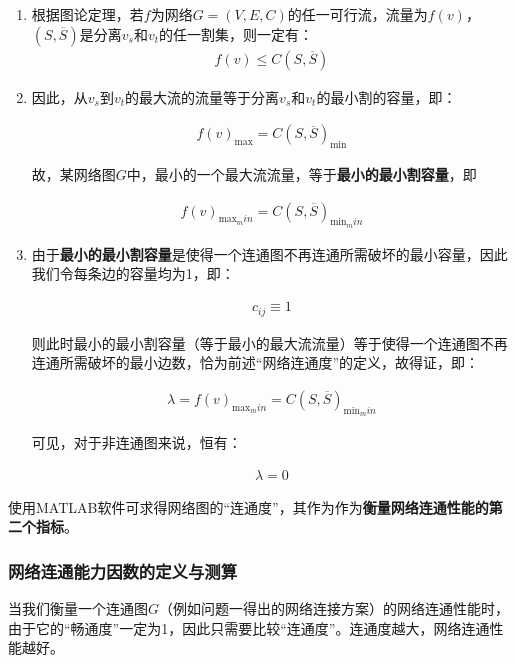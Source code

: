 \documentclass{article}
\begin{document}
\begin{enumerate}
	\item 根据图论定理，若$f$为网络$G=(V,E,C)$的任一可行流，流量为$f(v)$，$(S,\overline{S})$是分离$v_s$和$v_t$的任一割集，则一定有：
		\begin{align}
			f(v)\leqslant C(S,\overline{S})
		\end{align}

	\item 因此，从$v_s$到$v_t$的最大流的流量等于分离$v_s$和$v_t$的最小割的容量，即：

		\begin{align}
			f(v)_{\text{max}}=C(S,\overline{S})_{\text{min}}
		\end{align}

		故，某网络图$G$中，最小的一个最大流流量，等于\textbf{最小的最小割容量}，即

		\begin{align}
			f(v)_{{\text{max}}_min}=C(S,\overline{S})_{{\text{min}}_min}
		\end{align}

	\item 由于\textbf{最小的最小割容量}是使得一个连通图不再连通所需破坏的最小容量，因此我们令每条边的容量均为1，即：

		\begin{align}
			c_{ij} \equiv 1
		\end{align}

		则此时最小的最小割容量（等于最小的最大流流量）等于使得一个连通图不再连通所需破坏的最小边数，恰为前述“网络连通度”的定义，故得证，即：

		\begin{align}
			\lambda=f(v)_{{\text{max}}_min}=C(S,\overline{S})_{{\text{min}}_min}
		\end{align}

		可见，对于非连通图来说，恒有：

		\begin{align}
			\lambda=0
		\end{align}

\end{enumerate}

使用MATLAB软件可求得网络图的“连通度”，其作为作为\textbf{衡量网络连通性能的第二个指标}。

\subsubsection{网络连通能力因数的定义与测算}
\label{网络连通能力因数的定义与测算}

当我们衡量一个连通图$G$（例如问题一得出的网络连接方案）的网络连通性能时，由于它的“畅通度”一定为1，因此只需要比较“连通度”。连通度越大，网络连通性能越好。
\end{document}
